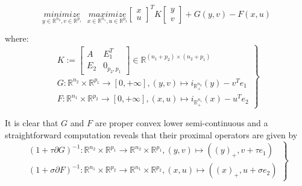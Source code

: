 \documentclass[a4paper,9pt,journal]{IEEEtran}
\begin{document}
\begin{equation}
  \underset{y \in \mathbb{R}^{n_2}, v\in \mathbb{R}^{p_1}}{minimize}\text{ }\underset{x \in \mathbb{R}^{n_1}, u \in \mathbb{R}^{p_2}}{maximize}
           {\begin{bmatrix}x\\u\end{bmatrix}^TK\begin{bmatrix}y\\v\end{bmatrix} + G(y, v) - F(x, u)}
  \label{eq:my_opt_pb}
\end{equation}

where:
\begin{equation}
  \left .
  \begin{split}
    K :=
    \left[
      \begin{array}{c|c}
        A & E_1^T \\ \hline
        E_2 & 0_{p_2, p_1}
      \end{array}
      \right] \in \mathbb{R}^{(n_1 + p_2) \times (n_2 + p_1)} \\
      G: \mathbb{R}^{n_2} \times \mathbb{R}^{p_1} \rightarrow [0, +\infty], (y, v) \mapsto i_{\mathbb{R}^{n_2}_+}(y) - v^Te_1\\
      F: \mathbb{R}^{n_1} \times \mathbb{R}^{p_2} \rightarrow [0, +\infty], (x, u) \mapsto i_{\mathbb{R}^{n_1}_+}(x) - u^Te_2
  \end{split}
  \right\}
\end{equation}

It is clear that $G$ and $F$ are proper convex lower semi-continuous and a straightforward computation reveals that their proximal operators are given by
\begin{equation}
  \left .
  \begin{split}
    (1 + \tau \partial G)^{-1}: \mathbb{R}^{n_2} \times \mathbb{R}^{p_1} \rightarrow \mathbb{R}^{n_2} \times \mathbb{R}^{p_1}, (y, v) \mapsto ((y)_+, v + \tau e_1)\\
    (1 + \sigma \partial F)^{-1}: \mathbb{R}^{n_1} \times \mathbb{R}^{p_2} \rightarrow \mathbb{R}^{n_1} \times \mathbb{R}^{p_2}, (x, u) \mapsto ((x)_+, u + \sigma e_2)
  \end{split}
  \right\}
\end{equation}
\end{document}

